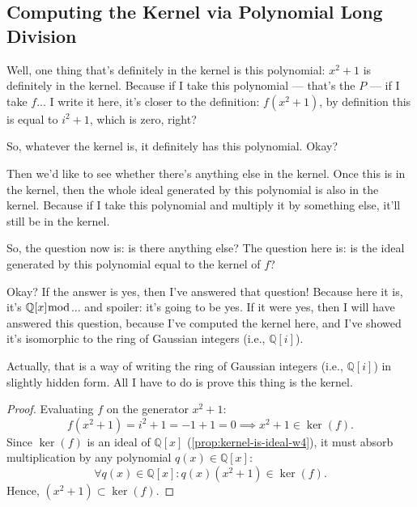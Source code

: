 \subsection{Computing the Kernel via Polynomial Long Division}

\begin{speech}[01:24:02 - 01:25:40]
Well, one thing that's definitely in the kernel is this polynomial: $x^2 + 1$ is definitely in the kernel.  Because if I take this polynomial --- that's the $P$ --- if I take $f$... I write it here, it's closer to the definition: $f(x^2 + 1)$, by definition this is equal to $i^2 + 1$, which is zero,  right? 

So, whatever the kernel is, it definitely has this polynomial. Okay? 

Then we'd like to see whether there's anything else in the kernel. Once this is in the kernel, then the whole ideal generated by this polynomial is also in the kernel.  Because if I take this polynomial and multiply it by something else, it'll still be in the kernel. 

So, the question now is: is there anything else? The question here is: is the ideal generated by this polynomial equal to the kernel of $f$?  

Okay? If the answer is yes, then I've answered that question! Because here it is, it's $\mathbb{Q}[x] \bmod$... and spoiler: it's going to be yes. If it were yes, then I will have answered this question, because I've computed the kernel here, and I've showed it's isomorphic to the ring of Gaussian integers (i.e., $\mathbb{Q}[i]$). 

Actually, that is a way of writing the ring of Gaussian integers (i.e., $\mathbb{Q}[i]$) in slightly hidden form. All I have to do is prove this thing is the kernel.
\end{speech}

\begin{content}

\begin{proof}
Evaluating $f$ on the generator $x^2 + 1$:
\[
f(x^2 + 1) = i^2 + 1 = -1 + 1 = 0 \implies x^2 + 1 \in \ker(f).
\]
Since $\ker(f)$ is an ideal of $\mathbb{Q}[x]$ (\cref{prop:kernel-is-ideal-w4}), it must absorb multiplication by any polynomial $q(x) \in \mathbb{Q}[x]$:
\[
\forall q(x) \in \mathbb{Q}[x] \colon q(x)(x^2 + 1) \in \ker(f).
\]
Hence, $(x^2 + 1) \subset \ker(f)$.
\end{proof}
\end{content}

